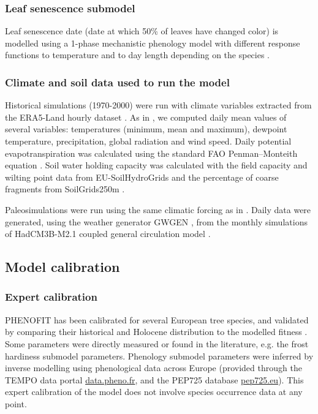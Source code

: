 \documentclass[letterpaper,8pt]{extarticle}  %
\begin{document}
\begin{doublespacing}
\begin{linenumbers}
\subsubsection{Leaf senescence submodel}
Leaf senescence date (date at which 50\% of leaves have changed color) is modelled using a 1-phase mechanistic phenology model with different response functions to temperature and to day length depending on the species \citep{Delpierre2009}. 

\subsubsection{Climate and soil data used to run the model}

Historical simulations (1970-2000) were run with climate variables extracted from the ERA5-Land hourly dataset \citep{MunozSabater2021}. As in \citet{VanderMeersch2023}, we computed daily mean values of several variables: temperatures (minimum, mean and maximum), dewpoint temperature, precipitation, global radiation and wind speed. Daily potential evapotranspiration was calculated using the standard FAO Penman–Monteith equation \citep{Allen1998}. Soil water holding capacity was calculated with the field capacity and wilting point data from EU-SoilHydroGrids \citep{Toth2017} and the percentage of coarse fragments from SoilGrids250m \citep{Hengl2017}.

Paleosimulations were run using the same climatic forcing as in \citet{VanderMeersch2024}. Daily data were generated, using the weather generator GWGEN \citep{Sommer2017}, from the monthly simulations of HadCM3B-M2.1 coupled general circulation model \citep{Armstrong2019}.

\subsection{Model calibration}

\subsubsection{Expert calibration}

PHENOFIT has been calibrated for several European tree species, and validated  by comparing their historical and Holocene distribution to the modelled fitness  \citep{Saltre2013, Duputie2015, Gauzere2020, VanderMeersch2024}. Some parameters were directly measured or found in the literature, e.g. the frost hardiness submodel parameters. Phenology submodel parameters were inferred by inverse modelling using phenological data across Europe (provided through the TEMPO data portal \url{data.pheno.fr}, and the PEP725 database \url{pep725.eu}). %
This expert calibration of the model does not involve species occurrence data at any point.


\end{linenumbers}
\end{doublespacing}
\end{document}
